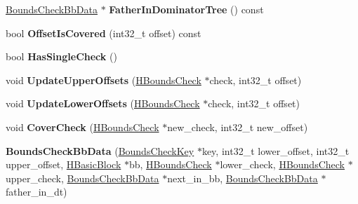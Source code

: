 \begin{DoxyCompactItemize}
\item 
\hyperlink{classv8_1_1internal_1_1_bounds_check_bb_data}{Bounds\+Check\+Bb\+Data} $\ast$ {\bfseries Father\+In\+Dominator\+Tree} () const \hypertarget{classv8_1_1internal_1_1_bounds_check_bb_data_a7b30a1ec519b9c7eb193f4d62ace7134}{}\label{classv8_1_1internal_1_1_bounds_check_bb_data_a7b30a1ec519b9c7eb193f4d62ace7134}

\item 
bool {\bfseries Offset\+Is\+Covered} (int32\+\_\+t offset) const \hypertarget{classv8_1_1internal_1_1_bounds_check_bb_data_a31b01a11fc7dc91f9f730cd846964f69}{}\label{classv8_1_1internal_1_1_bounds_check_bb_data_a31b01a11fc7dc91f9f730cd846964f69}

\item 
bool {\bfseries Has\+Single\+Check} ()\hypertarget{classv8_1_1internal_1_1_bounds_check_bb_data_a60a84a1534069c8392d4f4d2c1a10661}{}\label{classv8_1_1internal_1_1_bounds_check_bb_data_a60a84a1534069c8392d4f4d2c1a10661}

\item 
void {\bfseries Update\+Upper\+Offsets} (\hyperlink{classv8_1_1internal_1_1_h_bounds_check}{H\+Bounds\+Check} $\ast$check, int32\+\_\+t offset)\hypertarget{classv8_1_1internal_1_1_bounds_check_bb_data_ab8e202b743f598acfc51cedfed93f825}{}\label{classv8_1_1internal_1_1_bounds_check_bb_data_ab8e202b743f598acfc51cedfed93f825}

\item 
void {\bfseries Update\+Lower\+Offsets} (\hyperlink{classv8_1_1internal_1_1_h_bounds_check}{H\+Bounds\+Check} $\ast$check, int32\+\_\+t offset)\hypertarget{classv8_1_1internal_1_1_bounds_check_bb_data_a1294e4625db8756b987d83191dfda9ea}{}\label{classv8_1_1internal_1_1_bounds_check_bb_data_a1294e4625db8756b987d83191dfda9ea}

\item 
void {\bfseries Cover\+Check} (\hyperlink{classv8_1_1internal_1_1_h_bounds_check}{H\+Bounds\+Check} $\ast$new\+\_\+check, int32\+\_\+t new\+\_\+offset)\hypertarget{classv8_1_1internal_1_1_bounds_check_bb_data_a08bbd685e9d4b2268114719cdea4d6d3}{}\label{classv8_1_1internal_1_1_bounds_check_bb_data_a08bbd685e9d4b2268114719cdea4d6d3}

\item 
{\bfseries Bounds\+Check\+Bb\+Data} (\hyperlink{classv8_1_1internal_1_1_bounds_check_key}{Bounds\+Check\+Key} $\ast$key, int32\+\_\+t lower\+\_\+offset, int32\+\_\+t upper\+\_\+offset, \hyperlink{classv8_1_1internal_1_1_h_basic_block}{H\+Basic\+Block} $\ast$bb, \hyperlink{classv8_1_1internal_1_1_h_bounds_check}{H\+Bounds\+Check} $\ast$lower\+\_\+check, \hyperlink{classv8_1_1internal_1_1_h_bounds_check}{H\+Bounds\+Check} $\ast$upper\+\_\+check, \hyperlink{classv8_1_1internal_1_1_bounds_check_bb_data}{Bounds\+Check\+Bb\+Data} $\ast$next\+\_\+in\+\_\+bb, \hyperlink{classv8_1_1internal_1_1_bounds_check_bb_data}{Bounds\+Check\+Bb\+Data} $\ast$father\+\_\+in\+\_\+dt)\hypertarget{classv8_1_1internal_1_1_bounds_check_bb_data_a80784e614dd0f96c7dd278e50346c960}{}\label{classv8_1_1internal_1_1_bounds_check_bb_data_a80784e614dd0f96c7dd278e50346c960}

\end{DoxyCompactItemize}
